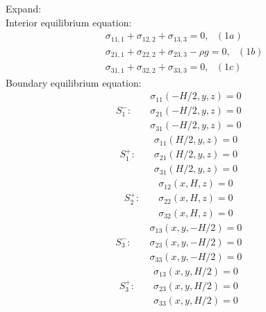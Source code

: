 \documentclass[letter,12pt]{article}
\begin{document}
Expand: \\
Interior equilibrium equation:
\begin{equation}
\begin{aligned}
& \sigma_{11,1}+\sigma_{12,2}+\sigma_{13,3}=0, \text{ }(1a) \\
& \sigma_{21,1}+\sigma_{22,2}+\sigma_{23,3}-\rho g=0, \text{ }(1b) \\
& \sigma_{31,1}+\sigma_{32,2}+\sigma_{33,3}=0, \text{ }(1c)
\end{aligned}
\end{equation}
Boundary equilibrium equation: 
\begin{equation}
S_{1}^{-}: \text{	}
\begin{aligned}
&\sigma_{11}(-H/2,y,z)=0\\
&\sigma_{21}(-H/2,y,z)=0\\
&\sigma_{31}(-H/2,y,z)=0
\end{aligned}
\end{equation}
\begin{equation}
S_{1}^{+}: \text{	}
\begin{aligned}
&\sigma_{11}(H/2,y,z)=0\\
&\sigma_{21}(H/2,y,z)=0\\
&\sigma_{31}(H/2,y,z)=0
\end{aligned}
\end{equation}
\begin{equation}
S_{2}^{+}: \text{	}
\begin{aligned}
&\sigma_{12}(x,H,z)=0\\
&\sigma_{22}(x,H,z)=0\\
&\sigma_{32}(x,H,z)=0
\end{aligned}
\end{equation}
\begin{equation}
S_{3}^{-}: \text{	}
\begin{aligned}
&\sigma_{13}(x,y,-H/2)=0\\
&\sigma_{23}(x,y,-H/2)=0\\
&\sigma_{33}(x,y,-H/2)=0
\end{aligned}
\end{equation}
\begin{equation}
S_{3}^{+}: \text{	}
\begin{aligned}
&\sigma_{13}(x,y,H/2)=0\\
&\sigma_{23}(x,y,H/2)=0\\
&\sigma_{33}(x,y,H/2)=0
\end{aligned}
\end{equation}
\\
	
\end{document}
